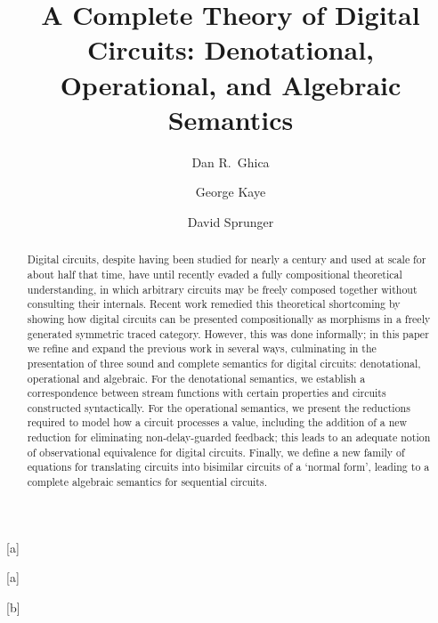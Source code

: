 \documentclass{lmcs}
\begin{document}
\title[A Complete Theory of Digital Circuits]{%
    A Complete Theory of Digital Circuits: %
    Denotational, Operational, and Algebraic Semantics}%


\author[D.~R.~Ghica]{Dan R.\ Ghica}[a]
\author[G.~Kaye]{George Kaye}[a]
\author[D.~Sprunger]{David Sprunger}[b]


\address{University of Birmingham}

\address{Indiana State University}

\begin{abstract}
    Digital circuits, despite having been studied for nearly a century and used
    at scale for about half that time, have until recently evaded a fully
    compositional theoretical understanding, in which arbitrary circuits may be
    freely composed together without consulting their internals.
    Recent work remedied this theoretical shortcoming by showing how digital
    circuits can be presented compositionally as morphisms in a freely generated
    symmetric traced category.
    However, this was done informally; in this paper we refine and expand the
    previous work in several ways, culminating in the presentation of three
    sound and complete semantics for digital circuits: denotational, operational
    and algebraic.
    For the denotational semantics, we establish a correspondence between
    stream functions with certain properties and circuits constructed
    syntactically.
    For the operational semantics, we present the reductions required to model
    how a circuit processes a value, including the addition of a new reduction
    for eliminating non-delay-guarded feedback; this leads to an adequate notion
    of observational equivalence for digital circuits.
    Finally, we define a new family of equations for translating circuits into
    bisimilar circuits of a `normal form', leading to a complete algebraic
    semantics for sequential circuits.
\end{abstract}

\maketitle
\end{document}
